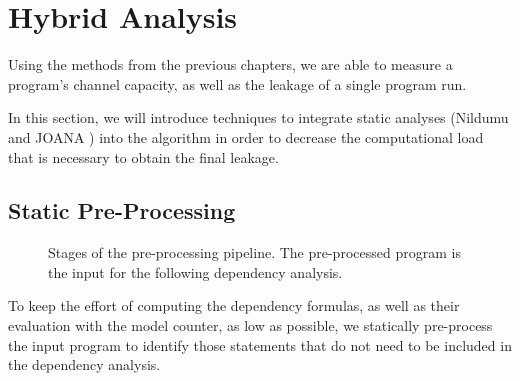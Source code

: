 \chapter{Hybrid Analysis}

Using the methods from the previous chapters, we are able to measure a program's channel capacity, as well as the leakage of a single program run.

In this section, we will introduce techniques to integrate static analyses (Nildumu \cite{bechberger18} and JOANA \cite{hammer09}) into the algorithm in order to decrease the computational load that is necessary to obtain the final leakage.

\section{Static Pre-Processing}\label{sec:pre}
\begin{figure}
    \centering
    \caption{Stages of the pre-processing pipeline. The pre-processed program is the input for the following dependency analysis.}
    \label{fig:pp}
\end{figure}

To keep the effort of computing the dependency formulas, as well as their evaluation with the model counter, as low as possible, we statically pre-process the input program to identify those statements that do not need to be included in the dependency analysis.

